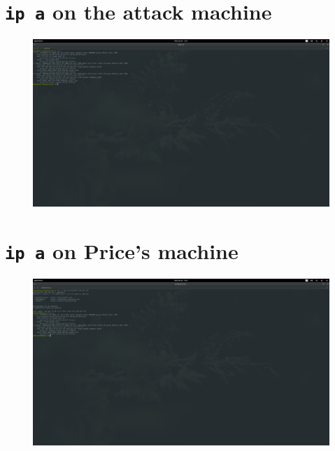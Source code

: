 \documentclass[12pt]{report}
\begin{document}
\section{\texttt{ip a} on the attack machine}
\label{app:screenshots:5}
\begin{figure}[H]
  \centering
  \includegraphics[width=0.7\paperheight, angle=-90]{It's_Elementary_my_dear_Watson!-2017-12-20-16-17-08}
\end{figure}
\section{\texttt{ip a} on Price's machine}
\label{app:screenshots:6}
\begin{figure}[H]
  \centering
  \includegraphics[width=0.7\paperheight, angle=-90]{It's_Elementary_my_dear_Watson!-2017-12-20-16-17-51}
\end{figure}
\end{document}
